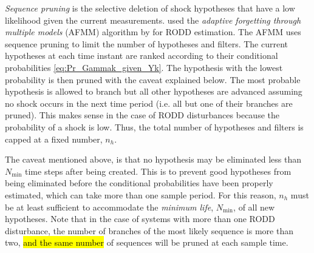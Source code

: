 {{\textit{Sequence pruning} is the selective deletion of shock hypotheses that have a low likelihood given the current measurements. \cite{eriksson_classification_1996} used the \textit{adaptive forgetting through multiple models} (\acrshort{AFMM}) algorithm by \cite{andersson_adaptive_1985} for \gls{RODD} estimation. The \gls{AFMM} uses sequence pruning to limit the number of hypotheses and filters. The current hypotheses at each time instant are ranked according to their conditional probabilities \eqref{eq:Pr_Gammak_given_Yk}. The hypothesis with the lowest probability is then pruned with the caveat explained below. The most probable hypothesis is allowed to branch but all other hypotheses are advanced assuming no shock occurs in the next time period (i.e. all but one of their branches are pruned). This makes sense in the case of \gls{RODD} disturbances because the probability of a shock is low. Thus, the total number of hypotheses and filters is capped at a fixed number, $n_h$.

The caveat mentioned above, is that no hypothesis may be eliminated less than $N_\text{min}$ time steps after being created. This is to prevent good hypotheses from being eliminated before the conditional probabilities have been properly estimated, which can take more than one sample period. For this reason, $n_h$ must be at least sufficient to accommodate the \textit{minimum life}, $N_\text{min}$, of all new hypotheses. Note that in the case of systems with more than one \gls{RODD} disturbance, the number of branches of the most likely sequence is more than two, \hl{and the same number} of sequences will be pruned at each sample time.
%

}}
